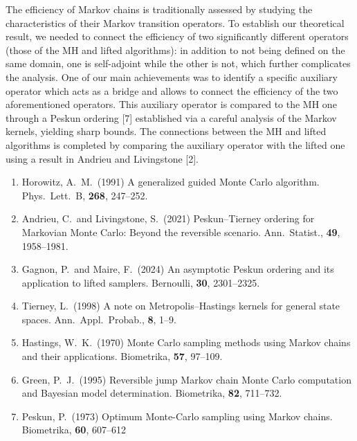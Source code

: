 \documentclass[12pt,lettersize,oneside]{book} %
\begin{document}
\begin{talk}
The efficiency of Markov chains is traditionally assessed by studying the characteristics of their Markov transition operators. To establish our theoretical result, we needed to connect the efficiency of two significantly different operators (those of the MH and lifted algorithms): in addition to not being defined on the same domain, one is self-adjoint while the other is not, which further complicates the analysis. One of our main achievements was to identify a specific auxiliary operator which acts as a bridge and allows to connect the efficiency of the two aforementioned operators. This auxiliary operator is compared to the MH one through a Peskun ordering [7] established via a careful analysis of the Markov kernels, yielding sharp bounds. The connections between the MH and lifted algorithms is completed by comparing the auxiliary operator with the lifted one using a result in Andrieu and Livingstone [2].

\medskip

\begin{enumerate}
 \item[{[1]}] Horowitz, A.\ M.\ (1991) A generalized guided Monte Carlo algorithm. Phys.\ Lett.\ B, \textbf{268}, 247--252.
 \item[{[2]}] Andrieu, C.\ and Livingstone, S.\ (2021) Peskun--Tierney ordering for Markovian Monte Carlo: Beyond the reversible scenario. Ann.\ Statist., \textbf{49}, 1958--1981.
    \item[{[3]}] Gagnon, P.\ and Maire, F.\ (2024) An asymptotic Peskun ordering and its application to lifted samplers. Bernoulli, \textbf{30}, 2301--2325.
    \item[{[4]}] Tierney, L.\ (1998) A note on Metropolis--Hastings kernels for general state spaces. Ann.\ Appl.\ Probab., \textbf{8}, 1--9.
    \item[{[5]}] Hastings, W.\ K.\ (1970) Monte Carlo sampling methods using Markov chains and their applications. Biometrika, \textbf{57}, 97--109.
    \item[{[6]}] Green, P.\ J.\ (1995) Reversible jump Markov chain Monte Carlo computation and Bayesian model determination. Biometrika, \textbf{82}, 711--732.
    \item[{[7]}] Peskun, P.\ (1973) Optimum Monte-Carlo sampling using Markov chains. Biometrika, \textbf{60}, 607--612
\end{enumerate}


\end{talk}
\end{document}
